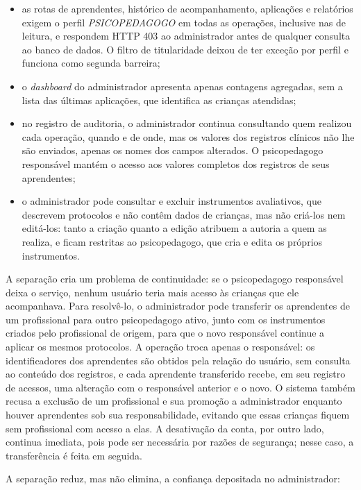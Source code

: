 \begin{itemize}
    \item as rotas de aprendentes, histórico de acompanhamento, aplicações e relatórios exigem o perfil \textit{PSICOPEDAGOGO} em todas as operações, inclusive nas de leitura, e respondem HTTP 403 ao administrador antes de qualquer consulta ao banco de dados. O filtro de titularidade deixou de ter exceção por perfil e funciona como segunda barreira;
    \item o \textit{dashboard} do administrador apresenta apenas contagens agregadas, sem a lista das últimas aplicações, que identifica as crianças atendidas;
    \item no registro de auditoria, o administrador continua consultando quem realizou cada operação, quando e de onde, mas os valores dos registros clínicos não lhe são enviados, apenas os nomes dos campos alterados. O psicopedagogo responsável mantém o acesso aos valores completos dos registros de seus aprendentes;
    \item o administrador pode consultar e excluir instrumentos avaliativos, que descrevem protocolos e não contêm dados de crianças, mas não criá-los nem editá-los: tanto a criação quanto a edição atribuem a autoria a quem as realiza, e ficam restritas ao psicopedagogo, que cria e edita os próprios instrumentos.
\end{itemize}

A separação cria um problema de continuidade: se o psicopedagogo responsável deixa o serviço, nenhum usuário teria mais acesso às crianças que ele acompanhava. Para resolvê-lo, o administrador pode transferir os aprendentes de um profissional para outro psicopedagogo ativo, junto com os instrumentos criados pelo profissional de origem, para que o novo responsável continue a aplicar os mesmos protocolos. A operação troca apenas o responsável: os identificadores dos aprendentes são obtidos pela relação do usuário, sem consulta ao conteúdo dos registros, e cada aprendente transferido recebe, em seu registro de acessos, uma alteração com o responsável anterior e o novo. O sistema também recusa a exclusão de um profissional e sua promoção a administrador enquanto houver aprendentes sob sua responsabilidade, evitando que essas crianças fiquem sem profissional com acesso a elas. A desativação da conta, por outro lado, continua imediata, pois pode ser necessária por razões de segurança; nesse caso, a transferência é feita em seguida.

A separação reduz, mas não elimina, a confiança depositada no administrador:

